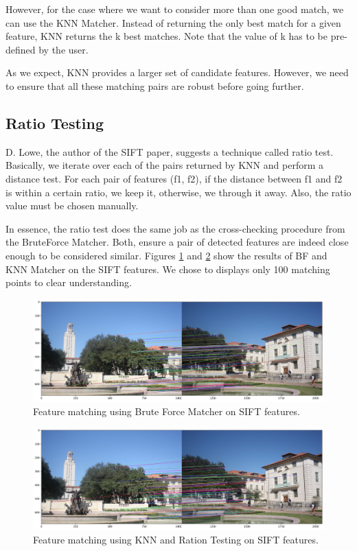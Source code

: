 \documentclass[10pt,twocolumn,letterpaper]{article}
\begin{document}
However, for the case where we want to consider more than one good match, we can use the KNN Matcher. Instead of returning the only best match for a given feature, KNN returns the k best matches. Note that the value of k has to be pre-defined by the user.

As we expect, KNN provides a larger set of candidate features. However, we need to ensure that all these matching pairs are robust before going further.

\subsection{Ratio Testing}

D. Lowe, the author of the SIFT paper, suggests a technique called ratio test. Basically, we iterate over each of the pairs returned by KNN and perform a distance test. For each pair of features (f1, f2), if the distance between f1 and f2 is within a certain ratio, we keep it, otherwise, we through it away. Also, the ratio value must be chosen manually.

In essence, the ratio test does the same job as the cross-checking procedure from the BruteForce Matcher. Both, ensure a pair of detected features are indeed close enough to be considered similar. Figures \ref{fig:bf-matching} and \ref{fig:knn-matching} show the results of BF and KNN Matcher on the SIFT features. We chose to displays only 100 matching points to clear understanding.

\begin{figure}
\begin{center}
	\includegraphics[width=0.99\columnwidth]{pics/bf_matching_img_1.jpeg}
	\caption{Feature matching using Brute Force Matcher on SIFT features. \label{fig:bf-matching}}   
\end{center} 
\end{figure}  

\begin{figure}
\begin{center}
	\includegraphics[width=0.99\columnwidth]{pics/knn_matching_img_1.jpeg}
	\caption{Feature matching using KNN and Ration Testing on SIFT features. \label{fig:knn-matching}}   
\end{center} 
\end{figure}
\end{document}
